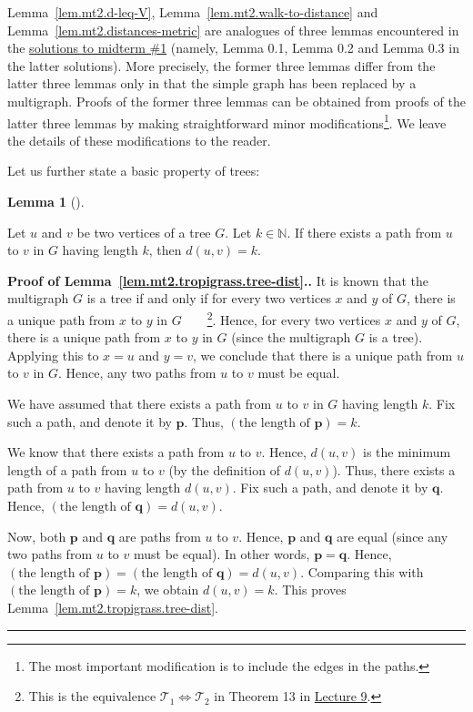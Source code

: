 \documentclass[numbers=enddot,12pt,final,onecolumn,notitlepage]{scrartcl}%
\theoremstyle{definition}
\newtheorem{lem}[theo]{Lemma}
\newenvironment{lemma}[1][]
{\begin{lem}[#1]\begin{leftbar}}
{\end{leftbar}\end{lem}}
\newenvironment{proof}[1][Proof]{\noindent\textbf{#1.} }{\ \rule{0.5em}{0.5em}}
\newcommand{\NN}{\mathbb{N}}
\newcommand{\tup}[1]{\left( #1 \right)}
\begin{document}
Lemma~\ref{lem.mt2.d-leq-V},
Lemma~\ref{lem.mt2.walk-to-distance} and
Lemma~\ref{lem.mt2.distances-metric} are analogues of three
lemmas encountered in the
\href{http://www.cip.ifi.lmu.de/~grinberg/t/17s/mt1s.pdf}{solutions to midterm \#1}
(namely, Lemma 0.1, Lemma 0.2 and Lemma 0.3 in the latter
solutions).
More precisely, the former three lemmas differ from the
latter three lemmas only in that the simple graph has been
replaced by a multigraph.
Proofs of the former three lemmas can be obtained from
proofs of the latter three lemmas by making straightforward
minor modifications\footnote{The most important
  modification is to include the edges in the paths.}.
We leave the details of these modifications to the reader.

Let us further state a basic property of trees:

\begin{lemma} \label{lem.mt2.tropigrass.tree-dist}
Let $u$ and $v$ be two vertices of a tree $G$.
Let $k \in \NN$.
If there exists a path from $u$ to $v$ in $G$ having
length $k$, then $d \tup{u, v} = k$.
\end{lemma}

\begin{proof}[Proof of Lemma~\ref{lem.mt2.tropigrass.tree-dist}.]
It is known that the multigraph $G$ is a tree if and only
if for every two vertices $x$ and $y$ of $G$, there is a
unique path from $x$ to $y$ in $G$\ \ \ \ \footnote{This
  is the equivalence
  $\mathcal{T}_1 \Longleftrightarrow \mathcal{T}_2$ in
  Theorem 13 in
  \href{http://www.cip.ifi.lmu.de/~grinberg/t/17s/5707lec9.pdf}{Lecture 9}.}.
Hence, for every two vertices $x$ and $y$ of $G$, there is a
unique path from $x$ to $y$ in $G$
(since the multigraph $G$ is a tree).
Applying this to $x = u$ and $y = v$, we conclude that
there is a unique path from $u$ to $v$ in $G$.
Hence, any two paths from $u$ to $v$ must be equal.

We have assumed that there exists a path from $u$ to $v$
in $G$ having length $k$.
Fix such a path, and denote it by $\mathbf{p}$.
Thus, $\tup{\text{the length of }\mathbf{p}} = k$.

We know that there exists a path from $u$ to $v$.
Hence, $d \tup{u, v}$ is the minimum length of a path from
$u$ to $v$ (by the definition of $d \tup{u, v}$).
Thus, there exists a path from $u$ to $v$ having length
$d \tup{u, v}$.
Fix such a path, and denote it by $\mathbf{q}$.
Hence, $\tup{\text{the length of }\mathbf{q}} = d \tup{u, v}$.

Now, both $\mathbf{p}$ and $\mathbf{q}$ are paths from
$u$ to $v$.
Hence, $\mathbf{p}$ and $\mathbf{q}$ are equal (since
any two paths from $u$ to $v$ must be equal).
In other words, $\mathbf{p} = \mathbf{q}$.
Hence,
$\tup{\text{the length of }\mathbf{p}}
= \tup{\text{the length of }\mathbf{q}} = d \tup{u, v}$.
Comparing this with
$\tup{\text{the length of }\mathbf{p}} = k$, we obtain
$d \tup{u, v} = k$.
This proves Lemma~\ref{lem.mt2.tropigrass.tree-dist}.
\end{proof}
\end{document}
